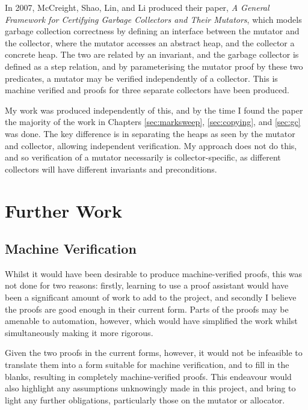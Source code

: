 In 2007, McCreight, Shao, Lin, and Li produced their paper, \textit{A
  General Framework for Certifying Garbage Collectors and Their
  Mutators}\cite{McCreight07}, which models garbage collection
correctness by defining an interface between the mutator and the
collector, where the mutator accesses an abstract heap, and the
collector a concrete heap. The two are related by an invariant, and
the garbage collector is defined as a step relation, and by
parameterising the mutator proof by these two predicates, a mutator
may be verified independently of a collector. This is machine
verified and proofs for three separate collectors have been
produced.

My work was produced independently of this, and by the time I found
the paper the majority of the work in Chapters \ref{sec:marksweep},
\ref{sec:copying}, and \ref{sec:gc} was done. The key difference is in
separating the heaps as seen by the mutator and collector, allowing
independent verification. My approach does not do this, and so
verification of a mutator necessarily is collector-specific, as
different collectors will have different invariants and preconditions.

\section{Further Work}
\label{sec:conclusion-further}

\subsection{Machine Verification}
\label{sec:conclusion-further-machineverification}

Whilst it would have been desirable to produce machine-verified
proofs, this was not done for two reasons: firstly, learning to use a
proof assistant would have been a significant amount of work to add to
the project, and secondly I believe the proofs are good enough in
their current form. Parts of the proofs may be amenable to automation,
however, which would have simplified the work whilst simultaneously
making it more rigorous.

Given the two proofs in the current forms, however, it would not be
infeasible to translate them into a form suitable for machine
verification, and to fill in the blanks, resulting in completely
machine-verified proofs. This endeavour would also highlight any
assumptions unknowingly made in this project, and bring to light any
further obligations, particularly those on the mutator or allocator.


